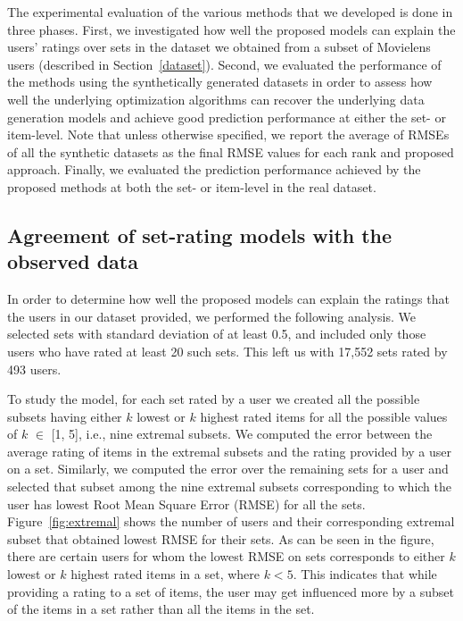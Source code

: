 

The experimental evaluation of the various methods that we developed is done in three
phases. First, we investigated how well the proposed models can explain the users' ratings over sets in the dataset we obtained from a subset of Movielens users
(described in Section~\ref{dataset}). Second, we evaluated the performance of the methods using the synthetically
generated datasets in order to assess how well the underlying optimization algorithms
can recover the underlying data generation models and achieve good prediction
performance at either the set- or item-level. Note that unless otherwise specified,  we report the average of RMSEs of all the
synthetic datasets as the final RMSE values for each rank and proposed approach. Finally, we evaluated the prediction performance achieved by the proposed methods at both the set- or item-level in the real dataset.


\subsection{Agreement of set-rating models with the observed data} \label{fit_rating_model}
In order to determine how well the proposed models can explain the ratings that the
users in our dataset provided, we performed the following analysis. We selected
sets with standard deviation of at least 0.5, and included only those users who
have rated at least 20 such sets. This left us with 17,552 sets rated by 493
users.

To study the \ES model, for each set rated
by a user we created all the possible subsets having either $k$ lowest or $k$
highest rated items for all the possible values of $k$ $\in$ [1, 5], i.e., nine
extremal subsets.
We computed the error between the average rating of items in the extremal
subsets and the rating provided by a user on a set. Similarly, we computed the
error over the remaining sets for a user and selected that subset among the nine
extremal subsets corresponding to which the user has lowest Root Mean Square
Error (RMSE) for all the sets.
Figure~\ref{fig:extremal} shows the number of users and their corresponding
extremal subset that obtained lowest RMSE for their sets. As can be seen in the
figure, there are certain users for whom the
lowest RMSE on sets corresponds to either $k$ lowest or $k$ highest rated items in a set,
where $k < 5$. This indicates that while providing a rating to a set of items, the user may get
influenced more by a subset of the items in a set rather than  all the items in
the set.


